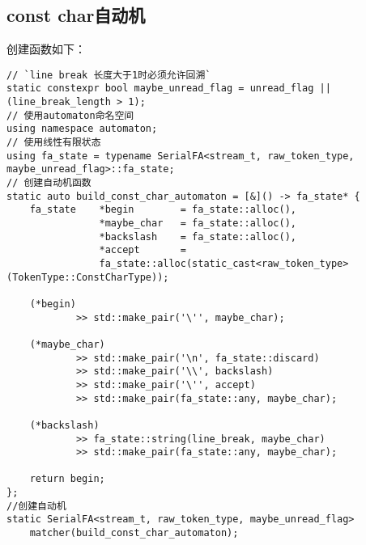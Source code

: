 \documentclass[UTF8]{ctexart}
\newcommand{\fira}[1]{{\firacode {}#1}}
\begin{document}
\subsection{const char自动机}
\begin{figure}[!h]
    \centering
\end{figure}
\par 创建函数如下：
{\firacode
\begin{lstlisting}[language={[ANSI]C++}]
// `line break 长度大于1时必须允许回溯`
static constexpr bool maybe_unread_flag = unread_flag || (line_break_length > 1);
// 使用automaton命名空间
using namespace automaton;
// 使用线性有限状态
using fa_state = typename SerialFA<stream_t, raw_token_type, maybe_unread_flag>::fa_state;
// 创建自动机函数
static auto build_const_char_automaton = [&]() -> fa_state* {
    fa_state    *begin        = fa_state::alloc(),
                *maybe_char   = fa_state::alloc(),
                *backslash    = fa_state::alloc(),
                *accept       =
                fa_state::alloc(static_cast<raw_token_type>(TokenType::ConstCharType));
    
    (*begin)
            >> std::make_pair('\'', maybe_char);
    
    (*maybe_char)
            >> std::make_pair('\n', fa_state::discard)
            >> std::make_pair('\\', backslash)
            >> std::make_pair('\'', accept)
            >> std::make_pair(fa_state::any, maybe_char);
            
    (*backslash)
            >> fa_state::string(line_break, maybe_char)
            >> std::make_pair(fa_state::any, maybe_char);

    return begin;
};
//创建自动机
static SerialFA<stream_t, raw_token_type, maybe_unread_flag> 
    matcher(build_const_char_automaton);
\end{lstlisting}
}
\end{document}
